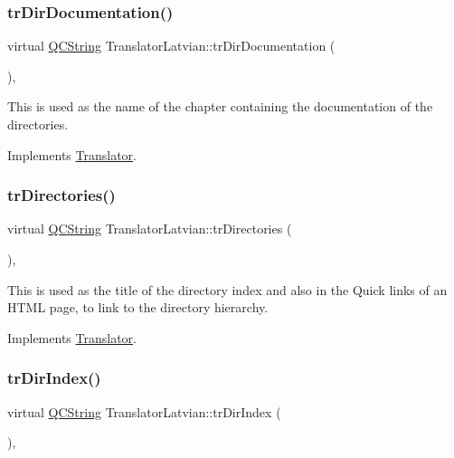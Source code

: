 \subsubsection{\texorpdfstring{trDirDocumentation()}{trDirDocumentation()}}
{\footnotesize\ttfamily virtual \mbox{\hyperlink{class_q_c_string}{Q\+C\+String}} Translator\+Latvian\+::tr\+Dir\+Documentation (\begin{DoxyParamCaption}{ }\end{DoxyParamCaption})\hspace{0.3cm}{\ttfamily [inline]}, {\ttfamily [virtual]}}

This is used as the name of the chapter containing the documentation of the directories. 

Implements \mbox{\hyperlink{class_translator}{Translator}}.

\mbox{\label{class_translator_latvian_affc6f859a4dd72f8e96925abac0c248c}} 
\subsubsection{\texorpdfstring{trDirectories()}{trDirectories()}}
{\footnotesize\ttfamily virtual \mbox{\hyperlink{class_q_c_string}{Q\+C\+String}} Translator\+Latvian\+::tr\+Directories (\begin{DoxyParamCaption}{ }\end{DoxyParamCaption})\hspace{0.3cm}{\ttfamily [inline]}, {\ttfamily [virtual]}}

This is used as the title of the directory index and also in the Quick links of an H\+T\+ML page, to link to the directory hierarchy. 

Implements \mbox{\hyperlink{class_translator}{Translator}}.

\mbox{\label{class_translator_latvian_ac4c7c586d8b6a02cd6383b0c7b4a0cf3}} 
\subsubsection{\texorpdfstring{trDirIndex()}{trDirIndex()}}
{\footnotesize\ttfamily virtual \mbox{\hyperlink{class_q_c_string}{Q\+C\+String}} Translator\+Latvian\+::tr\+Dir\+Index (\begin{DoxyParamCaption}{ }\end{DoxyParamCaption})\hspace{0.3cm}{\ttfamily [inline]}, {\ttfamily [virtual]}}

